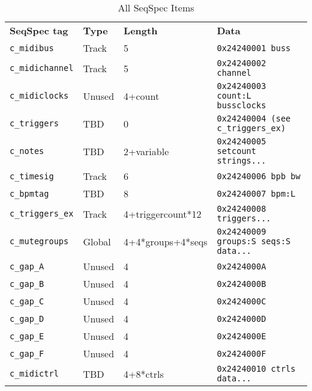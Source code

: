    \begin{table}[htb]
      \centering
      \caption{All SeqSpec Items}
      \label{table:seqspec_items_all}
      \begin{tabular}{l l l l}
         \textbf{SeqSpec tag}        & \textbf{Type} & \textbf{Length}   & \textbf{Data} \\
         \texttt{c\_midibus}         & Track         & 5                 & \texttt{0x24240001 buss} \\
         \texttt{c\_midichannel}     & Track         & 5                 & \texttt{0x24240002 channel} \\
         \texttt{c\_midiclocks}      & Unused        & 4+count           & \texttt{0x24240003 count:L bussclocks} \\
         \texttt{c\_triggers}        & TBD           & 0                 & \texttt{0x24240004 (see c\_triggers\_ex)} \\
         \texttt{c\_notes}           & TBD           & 2+variable        & \texttt{0x24240005 setcount strings...} \\
         \texttt{c\_timesig}         & Track         & 6                 & \texttt{0x24240006 bpb bw} \\
         \texttt{c\_bpmtag}          & TBD           & 8                 & \texttt{0x24240007 bpm:L } \\
         \texttt{c\_triggers\_ex}    & Track         & 4+triggercount*12 & \texttt{0x24240008 triggers...} \\
         \texttt{c\_mutegroups}      & Global        & 4+4*groups+4*seqs & \texttt{0x24240009 groups:S seqs:S data...} \\
         \texttt{c\_gap\_A}          & Unused        & 4                 & \texttt{0x2424000A} \\
         \texttt{c\_gap\_B}          & Unused        & 4                 & \texttt{0x2424000B} \\
         \texttt{c\_gap\_C}          & Unused        & 4                 & \texttt{0x2424000C} \\
         \texttt{c\_gap\_D}          & Unused        & 4                 & \texttt{0x2424000D} \\
         \texttt{c\_gap\_E}          & Unused        & 4                 & \texttt{0x2424000E} \\
         \texttt{c\_gap\_F}          & Unused        & 4                 & \texttt{0x2424000F} \\
         \texttt{c\_midictrl}        & TBD           & 4+8*ctrls         & \texttt{0x24240010 ctrls data...} \\

\end{tabular}
\end{table}
